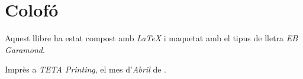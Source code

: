 \documentclass[12pt, a5paper, twoside]{book}
\let\cleardoublepage\clearpage %
\begin{document}
\cleardoublepage
\chapter*{Colofó}
Aquest llibre ha estat compost amb \textit{LaTeX} i maquetat amb el tipus de lletra \textit{EB Garamond}.

Imprès a \textit{TETA Printing}, el mes d'\textit{Abril} de \textit{\the\year}.

\cleardoublepage
\begin{titlepage}
\thispagestyle{empty}
\vfill
~
\end{titlepage}
\end{document}
